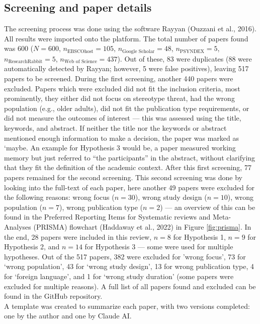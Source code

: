 \documentclass[
  stu, a4paper,floatsintext]{apa7}
\begin{document}
\subsection{Screening and paper details}\label{screening-and-paper-details}

The screening process was done using the software Rayyan (Ouzzani et al., 2016). All results were imported onto the platform.
The total number of papers found was 600 (\(N = 600\), \(n_{\text{EBSCOhost}} = 105\), \(n_{\text{Google Scholar}} = 48\), \(n_{\text{PSYNDEX}} = 5\), \(n_{\text{ResearchRabbit}} = 5\), \(n_{\text{Web of Science}} = 437\)). Out of these, 83 were duplicates (88 were automatically detected by Rayyan; however, 5 were false positives), leaving 517 papers to be screened. During the first screening, another 440 papers were excluded.
Papers which were excluded did not fit the inclusion criteria, most prominently, they either did not focus on stereotype threat, had the wrong population (e.g., older adults), did not fit the publication type requirements, or did not measure the outcomes of interest --- this was assessed using the title, keywords, and abstract. If neither the title nor the keywords or abstract mentioned enough information to make a decision, the paper was marked as `maybe.
An example for Hypothesis 3 would be, a paper measured working memory but just referred to ``the participants'' in the abstract, without clarifying that they fit the definition of the academic context. After this first screening, 77 papers remained for the second screening.
This second screening was done by looking into the full-text of each paper, here another 49 papers were excluded for the following reasons: wrong focus (\(n = 30\)), wrong study design (\(n = 10\)), wrong population (\(n = 7\)), wrong publication type (\(n = 2\)) --- an overview of this can be found in the Preferred Reporting Items for Systematic reviews and Meta-Analyses (PRISMA) flowchart (Haddaway et al., 2022) in Figure \ref{fig:prisma}.
In the end, 28 papers were included in this review, \(n = 8\) for Hypothesis 1, \(n = 9\) for Hypothesis 2, and \(n = 14\) for Hypothesis 3 --- some were used for multiple hypotheses. Out of the 517 papers, 382 were excluded for 'wrong focus', 73 for `wrong population', 43 for `wrong study design', 13 for wrong publication type, 4 for `foreign language', and 1 for `wrong study duration' (some papers were excluded for multiple reasons). A full list of all papers found and excluded can be found in the GitHub repository.\\
A template was created to summarize each paper, with two versions completed: one by the author and one by Claude AI.
\end{document}
